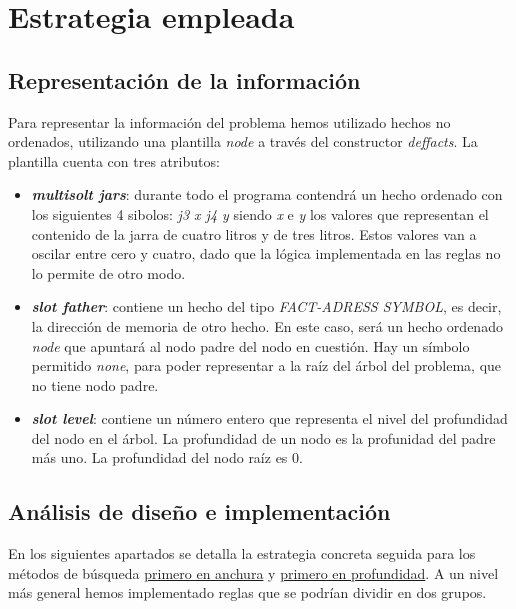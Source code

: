 \documentclass[11pt,a4paper,final]{article}
\begin{document}
\newpage

\section{Estrategia empleada}
\subsection{Representación de la información}
Para representar la información del problema hemos utilizado hechos no ordenados, utilizando una plantilla \emph{node} a través del constructor \emph{deffacts}. La plantilla cuenta con tres atributos: 

\begin{itemize}
	\item \textbf{\emph{multisolt jars}}: durante todo el programa contendrá un hecho ordenado con los siguientes 4 sibolos: \emph{j3 x j4 y} siendo \emph{x} e \emph{y} los valores que representan el contenido de la jarra de cuatro litros y de tres litros. Estos valores van a oscilar entre cero y cuatro, dado que la lógica implementada en las reglas no lo permite de otro modo.
	\item \textbf{\emph{slot father}}: contiene un hecho del tipo \emph{FACT-ADRESS SYMBOL}, es decir, la dirección de memoria de otro hecho. En este caso, será un hecho ordenado \emph{node} que apuntará al nodo padre del nodo en cuestión. Hay un símbolo permitido \emph{none}, para poder representar a la raíz del árbol del problema, que no tiene nodo padre.
	\item \textbf{\emph{slot level}}: contiene un número entero que representa el nivel del profundidad del nodo en el árbol. La profundidad de un nodo es la profunidad del padre más uno. La profundidad del nodo raíz es 0.
\end{itemize}

\subsection{Análisis de diseño e implementación}
En los siguientes apartados se detalla la estrategia concreta seguida para los métodos de búsqueda \hyperref[anchura]{primero en anchura} y \hyperref[profundidad]{primero en profundidad}. A un nivel más general hemos implementado reglas que se podrían dividir en dos grupos.
\end{document}
